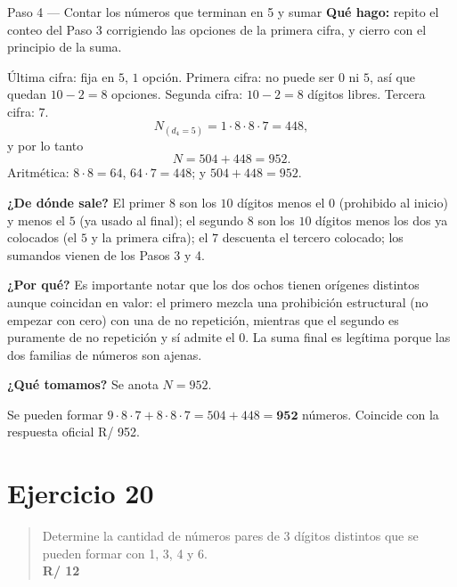 \documentclass[11pt]{article}
\begin{document}
\begin{paso}{Paso 4 --- Contar los números que terminan en 5 y sumar}
\textbf{Qué hago:} repito el conteo del Paso 3 corrigiendo las opciones de la primera cifra, y cierro con el principio de la suma.

Última cifra: fija en $5$, $1$ opción. Primera cifra: no puede ser $0$ ni $5$, así que quedan $10-2=8$ opciones. Segunda cifra: $10-2=8$ dígitos libres. Tercera cifra: $7$.
\[
  N_{(d_4=5)} = 1\cdot 8\cdot 8\cdot 7 = 448 ,
\]
y por lo tanto
\[
  N = 504 + 448 = 952 .
\]
Aritmética: $8\cdot 8=64$, $64\cdot 7=448$; y $504+448=952$.

\textbf{¿De dónde sale?} El primer $8$ son los $10$ dígitos menos el $0$ (prohibido al inicio) y menos el $5$ (ya usado al final); el segundo $8$ son los $10$ dígitos menos los dos ya colocados (el $5$ y la primera cifra); el $7$ descuenta el tercero colocado; los sumandos vienen de los Pasos 3 y 4.

\textbf{¿Por qué?} Es importante notar que los dos ochos tienen orígenes distintos aunque coincidan en valor: el primero mezcla una prohibición estructural (no empezar con cero) con una de no repetición, mientras que el segundo es puramente de no repetición y sí admite el $0$. La suma final es legítima porque las dos familias de números son ajenas.

\textbf{¿Qué tomamos?} Se anota $N=952$.
\end{paso}

\begin{resp}
Se pueden formar $9\cdot 8\cdot 7 + 8\cdot 8\cdot 7 = 504+448=\mathbf{952}$ números. Coincide con la respuesta oficial R/ 952.
\end{resp}

\section*{Ejercicio 20}

\begin{quote}
Determine la cantidad de números pares de 3 dígitos distintos que se pueden formar con 1, 3, 4 y 6.\\[2pt]
\textbf{R/ 12}
\end{quote}
\end{document}
